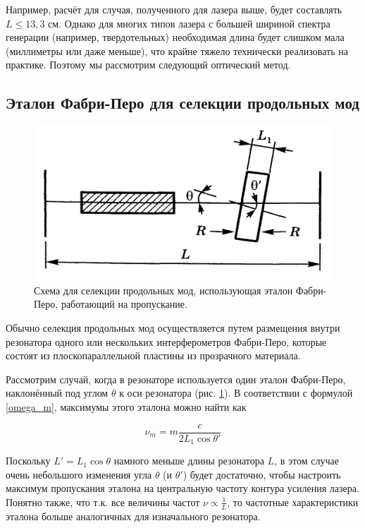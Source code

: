 \documentclass[12pt]{kiarticle}
\begin{document}
Например, расчёт для случая, полученного для лазера выше, будет составлять $ L \leq 13,3 $ см. Однако для многих типов лазера с большей шириной спектра генерации (например, твердотельных) необходимая длина будет слишком мала (миллиметры или даже меньше), что крайне тяжело технически реализовать на практике. Поэтому мы рассмотрим следующий оптический метод.

\subsection{Эталон Фабри-Перо для селекции продольных мод}

\begin{figure} 
	\includegraphics[width=\linewidth]{FP_selection}
	\caption{Схема для селекции продольных мод, использующая эталон Фабри-Перо, работающий на пропускание.}
	\label{FP_selection}
\end{figure}

Обычно селекция продольных мод осуществляется путем размещения внутри резонатора одного или нескольких интерферометров Фабри-Перо, которые состоят из плоскопараллельной пластины из прозрачного материала. 

Рассмотрим случай, когда в резонаторе используется один эталон Фабри-Перо, наклонённый под углом $ \theta $ к оси резонатора (рис. \ref{FP_selection}). В соответствии с формулой \eqref{omega_m}, максимумы этого эталона можно найти как 

\begin{equation}\label{}
\nu_m = m \dfrac{c}{2L_1 \cos \theta'}
\end{equation}

Поскольку $ L' = L_1 \cos \theta $ намного меньше длины резонатора $ L $, в этом случае очень небольшого изменения угла $ \theta $ (и $ \theta' $) будет достаточно, чтобы настроить максимум пропускания эталона на центральную частоту контура усиления лазера. Понятно также, что т.к. все величины частот $ \nu \propto \frac{1}{L} $, то частотные характеристики эталона больше аналогичных для изначального резонатора. 
\end{document}
